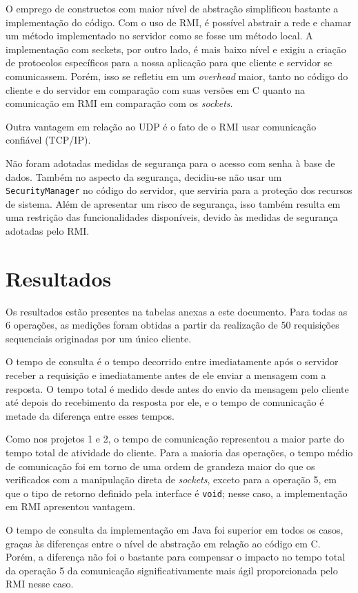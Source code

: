 \documentclass[11pt, brazil]{article} %
\begin{document}
O emprego de constructos com maior nível de abstração simplificou bastante a implementação do código. Com o uso de RMI, é possível abstrair a rede e chamar um método implementado no servidor como se fosse um método local. A implementação com seckets, por outro lado, é mais baixo nível e exigiu a criação de protocolos específicos para a nossa aplicação para que cliente e servidor se comunicassem. Porém, isso se refletiu em um \emph{overhead} maior, tanto no código do cliente e do servidor em comparação com suas versões em C quanto na comunicação em RMI em comparação com os \emph{sockets}.

Outra vantagem em relação ao UDP é o fato de o RMI usar comunicação confiável (TCP/IP). 

Não foram adotadas medidas de segurança para o acesso com senha à base de dados. Também no aspecto da segurança, decidiu-se não usar um \texttt{SecurityManager} no código do servidor, que serviria para a proteção dos recursos de sistema. 
Além de apresentar um risco de segurança, isso também resulta em uma restrição das funcionalidades disponíveis, devido às medidas de segurança adotadas pelo RMI.

\section{Resultados}

Os resultados estão presentes na tabelas anexas a este documento. Para todas as 6 operações,
as medições foram obtidas a partir da realização de 50 requisições sequenciais originadas
por um único cliente.

O tempo de consulta é o tempo decorrido entre imediatamente após o servidor receber a requisição e imediatamente antes de ele enviar a mensagem com a resposta. O tempo total é medido desde antes do envio da mensagem pelo cliente até depois do recebimento da resposta por ele, e o tempo de comunicação é metade da diferença entre esses tempos.

Como nos projetos 1 e 2, o tempo de comunicação representou a maior parte do tempo total de atividade do cliente. Para a maioria das operações, o tempo médio de comunicação foi em torno de uma ordem de grandeza maior do que os verificados com a manipulação direta de \emph{sockets}, exceto para a operação 5, em que o tipo de retorno definido pela interface é \texttt{void}; nesse caso, a implementação em RMI apresentou vantagem.

O tempo de consulta da implementação em Java foi superior em todos os casos, graças às diferenças entre o nível de abstração em relação ao código em C. Porém, a diferença não foi o bastante para compensar o impacto no tempo total da operação 5 da comunicação significativamente mais ágil proporcionada pelo RMI nesse caso.
\end{document}
